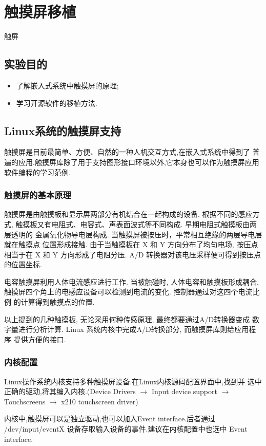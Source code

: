 \chapter{触摸屏移植}{触屏}\label{ch-ts}

\section{实验目的}
\begin{itemize}\itemsep=-3pt
  \item 了解嵌入式系统中触摸屏的原理;
  \item 学习开源软件的移植方法.
\end{itemize}

\section{Linux系统的触摸屏支持}
	触摸屏是目前最简单、方便、自然的一种人机交互方式,在嵌入式系统中得到了
普遍的应用.触摸屏库除了用于支持图形接口环境以外,它本身也可以作为触摸屏应用
软件编程的学习范例.

\subsection{触摸屏的基本原理}
    触摸屏是由触摸板和显示屏两部分有机结合在一起构成的设备. 根据不同的感应方式,
触摸板又有电阻式、电容式、声表面波式等不同构成. 早期电阻式触摸板由两层透明的
金属氧化物导电层构成. 当触摸屏被按压时，平常相互绝缘的两层导电层就在触摸点
位置形成接触. 由于当触摸板在 X 和 Y 方向分布了均匀电场, 按压点相当于在 X 和
Y 方向形成了电阻分压. A/D 转换器对该电压采样便可得到按压点的位置坐标.

    电容触摸屏利用人体电流感应进行工作. 当被触碰时, 人体电容和触摸板形成耦合,
触摸屏四个角上的电感应设备可以检测到电流的变化. 控制器通过对这四个电流比例
的计算得到触摸点的位置.

    以上提到的几种触摸板, 无论采用何种传感原理, 最终都要通过A/D转换器变成
数字量进行分析计算. Linux 系统内核中完成A/D转换部分, 而触摸屏库则给应用程序
提供方便的接口.

\subsection{内核配置}
	Linux操作系统内核支持多种触摸屏设备.在Linux内核源码配置界面中,找到并
选中正确的驱动,将其编入内核.(Device Drivers $\to$ Input device support
$\to$ Touchscreens $\to$ x210 touchscreen driver)

	内核中,触摸屏可以是独立驱动,也可以加入Event interface.后者通过
 /dev/input/eventX 设备存取输入设备的事件.建议在内核配置中也选中
 Event interface.


